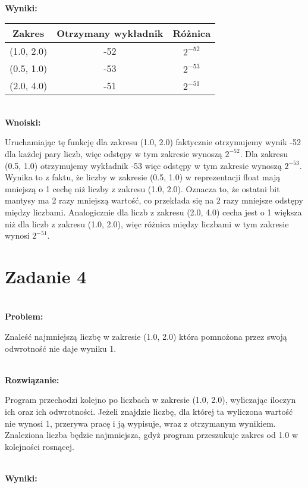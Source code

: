 \documentclass[a4paper,12pt]{article}
\begin{document}
\textbf{\\Wyniki:}

\begin{center}
\begin{tabular}{ |c|c|c| }
\hline
Zakres & Otrzymany wykładnik & Różnica \\
\hline
(1.0, 2.0) & \small{-52} & \small{\(2^{-52}\)} \\
(0.5, 1.0) & \small{-53} & \small{\(2^{-53}\)} \\
(2.0, 4.0) & \small{-51} & \small{\(2^{-51}\)} \\
\hline
\end{tabular}
\end{center}


\textbf{\\Wnoiski:}

Uruchamiając tę funkcję dla zakresu (1.0, 2.0) faktycznie otrzymujemy wynik -52 dla każdej pary liczb, więc odstępy w tym zakresie wynoszą \(2^{-52}\).
Dla zakresu (0.5, 1.0) otrzymujemy wykładnik -53 więc odstępy w tym zakresie wynoszą \(2^{-53}\). Wynika to z faktu, że liczby w zakresie (0.5, 1.0) w reprezentacji float mają mniejszą o 1 cechę niż liczby z zakresu (1.0, 2.0). Oznacza to, że ostatni bit mantysy ma 2 razy mniejszą wartość, co przekłada się na 2 razy mniejsze odstępy między liczbami. Analogicznie dla liczb z zakresu (2.0, 4.0) cecha jest o 1 większa niż dla liczb z zakresu (1.0, 2.0), więc
różnica między liczbami w tym zakresie wynosi \(2^{-51}\).

\section{Zadanie 4}

\textbf{\\Problem:}

Znaleść najmniejszą liczbę w zakresie (1.0, 2.0) która pomnożona przez swoją odwrotność nie daje wyniku 1.

\textbf{\\Rozwiązanie:}

Program przechodzi kolejno po liczbach w zakresie (1.0, 2.0), wyliczając iloczyn ich oraz ich odwrotności. Jeżeli znajdzie liczbę, dla której ta wyliczona wartość nie wynosi 1, przerywa pracę i ją wypisuje, wraz z otrzymanym wynikiem. Znaleziona liczba będzie najmniejsza, gdyż program przeszukuje zakres od 1.0 w kolejności rosnącej.

\textbf{\\Wyniki:}
\end{document}
